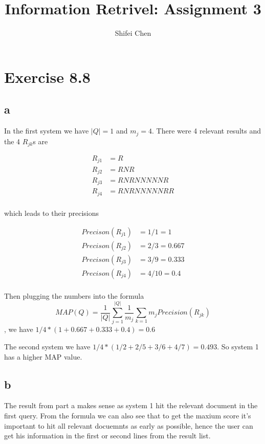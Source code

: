 \documentclass[11pt]{article} %
\title{{\LARGE Information Retrivel: Assignment 3}\\[1.5mm]} %
\author{Shifei Chen} %
\begin{document}
\maketitle

\section*{Exercise 8.8}

\subsection*{a}

In the first system we have $|Q|=1$ and $m_j=4$. There were 4 relevant results and the 4 $R_{jk}$s are

\begin{align*}
    R_{j1} &= {R}\\
    R_{j2} &= {RNR}\\
    R_{j3} &= {RNRNN NNNR}\\
    R_{j4} &= {RNRNN NNNRR}\\
\end{align*}

which leads to their precisions

\begin{align*}
    Precison(R_{j1}) &= 1/1 = 1\\
    Precison(R_{j2}) &= 2/3 = 0.667\\
    Precison(R_{j3}) &= 3/9 = 0.333\\
    Precison(R_{j4}) &= 4/10 = 0.4\\
\end{align*}

Then plugging the numbers into the formula $$MAP(Q) = \frac{1}{|Q|}\sum_{j=1}^{|Q|}\frac{1}{m_j}\sum_{k=1}{m_j}Precision(R_{jk})$$, we have $1/4*(1+0.667+0.333+0.4) = 0.6$

The second system we have $1/4*(1/2+2/5+3/6+4/7) = 0.493$. So system 1 has a higher MAP value.

\subsection*{b}

The result from part a makes sense as system 1 hit the relevant document in the first query. From the formula we can also see that to get the maxium score it's important to hit all relevant docuemnts as early as possible, hence the user can get his information in the first or second lines from the result list.
\end{document}
